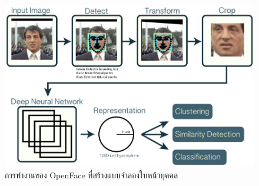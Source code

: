 \begin{figure}[!ht]
  \begin{center}
    \includegraphics[scale=.25]{pic/openface.jpg}
    \caption[การทำงานของ OpenFace ที่สร้างแบบจำลองใบหน้าบุคคล]{การทำงานของ OpenFace ที่สร้างแบบจำลองใบหน้าบุคคล}
    \label{fig:openface2}
  \end{center}
\end{figure}
